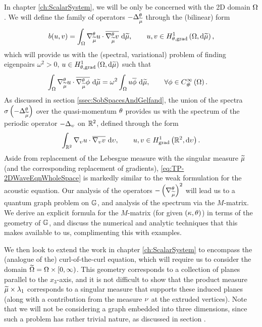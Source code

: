 In chapter \ref{ch:ScalarSystem}, we will be only be concerned with the 2D domain $\Omega$.
We will define the family of operators $-\Delta_{\widetilde{\mu}}^{\theta}$ through the (bilinear) form 
\begin{align*}
	b(u,v) = \int_{\Omega} \nabla^{\theta}_{\widetilde{\mu}} u\cdot\overline{\nabla^{\theta}_{\widetilde{\mu}} v}  \ \mathrm{d}\widetilde{\mu},
	\qquad u,v\in H^1_{\theta, \mathrm{grad}}\left( \Omega, \mathrm{d}\widetilde{\mu} \right),
\end{align*}
which will provide us with the (spectral, variational) problem of finding eigenpairs $\omega^2>0$, $u\in H^1_{\theta, \mathrm{grad}}\left( \Omega, \mathrm{d}\widetilde{\mu} \right)$ such that
\begin{align*}
	\int_{\Omega} \nabla^{\theta}_{\widetilde{\mu}} u\cdot\overline{\nabla^{\theta}_{\widetilde{\mu}}\phi}  \ \mathrm{d}\widetilde{\mu}
	&= \omega^2\int_{\Omega} u\overline{\phi}  \ \mathrm{d}\widetilde{\mu},
	\qquad\forall\phi\in C^{\infty}_{\#}\left( \Omega \right).
\end{align*}
As discussed in section \ref{ssec:SobSpacesAndGelfand}, the union of the spectra $\sigma\left( -\Delta_{\widetilde{\mu}}^{\theta} \right)$ over the quasi-momentum $\theta$ provides us with the spectrum of the periodic operator $-\Delta_{\upsilon}$ on $\mathbb{R}^2$, defined through the form
\begin{align} \label{eq:TP-2DWaveEqnWholeSpace}
	\int_{\mathbb{R}^2} \nabla_{\upsilon} u\cdot\overline{\nabla_{\upsilon} v}  \ \mathrm{d}\upsilon,
	\qquad u,v\in H^1_\mathrm{grad}\left( \mathbb{R}^2, \mathrm{d}\upsilon \right).
\end{align}
Aside from replacement of the Lebesgue measure with the singular measure $\widetilde{\mu}$ (and the corresponding replacement of gradients), \eqref{eq:TP-2DWaveEqnWholeSpace} is markedly similar to the weak formulation for the acoustic equation.
Our analysis of the operators $-\left( \nabla^{\theta}_{\widetilde{\mu}} \right)^2$ will lead us to a quantum graph problem on $\mathbb{G}$, and analysis of the spectrum via the $M$-matrix.
We derive an explicit formula for the $M$-matrix (for given $\left( \kappa, \theta \right)$) in terms of the geometry of $\mathbb{G}$, and discuss the numerical and analytic techniques that this makes available to us, complimenting this with examples.

We then look to extend the work in chapter \ref{ch:ScalarSystem} to encompass the (analogue of the) curl-of-the-curl equation, which will require us to consider the domain $\widetilde{\Omega} = \Omega\times[0,\infty)$.
This geometry corresponds to a collection of planes parallel to the $x_3$-axis, and it is not difficult to show that the product measure $\widetilde{\mu}\times\lambda_1$ corresponds to a singular measure that supports these induced planes (along with a contribution from the measure $\nu$ at the extruded vertices).
Note that we will not be considering a graph embedded into three dimensions, since such a problem has rather trivial nature, as discussed in section .

